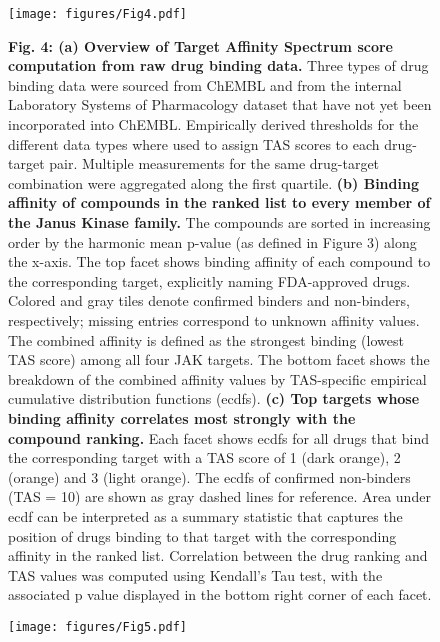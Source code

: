 \documentclass{article}
\begin{document}

\begin{figure}
  \centering
  \texttt{[image: figures/Fig4.pdf]}
\end{figure}

\begin{figure}
  \caption{\textbf{Fig. 4: (a) Overview of Target Affinity Spectrum score computation from raw drug binding data.} Three types of drug binding data were sourced from ChEMBL and from the internal Laboratory Systems of Pharmacology dataset that have not yet been incorporated into ChEMBL. Empirically derived thresholds for the different data types where used to assign TAS scores to each drug-target pair. Multiple measurements for the same drug-target combination were aggregated along the first quartile. \textbf{(b) Binding affinity of compounds in the ranked list to every member of the Janus Kinase family.} The compounds are sorted in increasing order by the harmonic mean p-value (as defined in Figure 3) along the x-axis. The top facet shows binding affinity of each compound to the corresponding target, explicitly naming FDA-approved drugs. Colored and gray tiles denote confirmed binders and non-binders, respectively; missing entries correspond to unknown affinity values. The combined affinity is defined as the strongest binding (lowest TAS score) among all four JAK targets. The bottom facet shows the breakdown of the combined affinity values by TAS-specific empirical cumulative distribution functions (ecdfs). \textbf{(c) Top targets whose binding affinity correlates most strongly with the compound ranking.} Each facet shows ecdfs for all drugs that bind the corresponding target with a TAS score of 1 (dark orange), 2 (orange) and 3 (light orange). The ecdfs of confirmed non-binders (TAS = 10) are shown as gray dashed lines for reference. Area under ecdf can be interpreted as a summary statistic that captures the position of drugs binding to that target with the corresponding affinity in the ranked list. Correlation between the drug ranking and TAS values was computed using Kendall’s Tau test, with the associated p value displayed in the bottom right corner of each facet.}
\end{figure}


\begin{landscape}
  \begin{figure}
    \centering
    \texttt{[image: figures/Fig5.pdf]}
  \end{figure}
\end{landscape}
\end{document}
